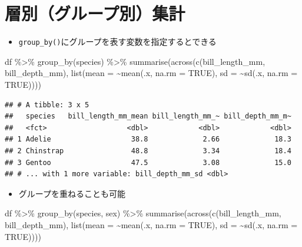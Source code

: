 \documentclass[
  xelatex,ja=standard, b5paper]{bxjsbook}
\newenvironment{Shaded}{\begin{snugshade}}{\end{snugshade}}
\newcommand{\AttributeTok}[1]{\textcolor[rgb]{0.77,0.63,0.00}{#1}}
\newcommand{\ConstantTok}[1]{\textcolor[rgb]{0.00,0.00,0.00}{#1}}
\newcommand{\FunctionTok}[1]{\textcolor[rgb]{0.00,0.00,0.00}{#1}}
\newcommand{\NormalTok}[1]{#1}
\newcommand{\SpecialCharTok}[1]{\textcolor[rgb]{0.00,0.00,0.00}{#1}}
\providecommand{\tightlist}{%
  \setlength{\itemsep}{0pt}\setlength{\parskip}{0pt}}
\begin{document}
\hypertarget{su-group}{%
\section{層別（グループ別）集計}\label{su-group}}

\begin{itemize}
\tightlist
\item
  \texttt{group\_by()}にグループを表す変数を指定するとできる
\end{itemize}

\begin{Shaded}
\begin{Highlighting}[]
\NormalTok{df }\SpecialCharTok{\%\textgreater{}\%} 
  \FunctionTok{group\_by}\NormalTok{(species) }\SpecialCharTok{\%\textgreater{}\%} 
  \FunctionTok{summarise}\NormalTok{(}\FunctionTok{across}\NormalTok{(}\FunctionTok{c}\NormalTok{(bill\_length\_mm, bill\_depth\_mm),}
                   \FunctionTok{list}\NormalTok{(}\AttributeTok{mean =} \SpecialCharTok{\textasciitilde{}}\FunctionTok{mean}\NormalTok{(.x, }\AttributeTok{na.rm =} \ConstantTok{TRUE}\NormalTok{),}
                        \AttributeTok{sd =} \SpecialCharTok{\textasciitilde{}}\FunctionTok{sd}\NormalTok{(.x, }\AttributeTok{na.rm =} \ConstantTok{TRUE}\NormalTok{))))}
\end{Highlighting}
\end{Shaded}

\begin{verbatim}
## # A tibble: 3 x 5
##   species   bill_length_mm_mean bill_length_mm_~ bill_depth_mm_m~
##   <fct>                   <dbl>            <dbl>            <dbl>
## 1 Adelie                   38.8             2.66             18.3
## 2 Chinstrap                48.8             3.34             18.4
## 3 Gentoo                   47.5             3.08             15.0
## # ... with 1 more variable: bill_depth_mm_sd <dbl>
\end{verbatim}

\begin{itemize}
\tightlist
\item
  グループを重ねることも可能
\end{itemize}

\begin{Shaded}
\begin{Highlighting}[]
\NormalTok{df }\SpecialCharTok{\%\textgreater{}\%} 
  \FunctionTok{group\_by}\NormalTok{(species, sex) }\SpecialCharTok{\%\textgreater{}\%} 
  \FunctionTok{summarise}\NormalTok{(}\FunctionTok{across}\NormalTok{(}\FunctionTok{c}\NormalTok{(bill\_length\_mm, bill\_depth\_mm),}
                   \FunctionTok{list}\NormalTok{(}\AttributeTok{mean =} \SpecialCharTok{\textasciitilde{}}\FunctionTok{mean}\NormalTok{(.x, }\AttributeTok{na.rm =} \ConstantTok{TRUE}\NormalTok{),}
                        \AttributeTok{sd =} \SpecialCharTok{\textasciitilde{}}\FunctionTok{sd}\NormalTok{(.x, }\AttributeTok{na.rm =} \ConstantTok{TRUE}\NormalTok{))))}
\end{Highlighting}
\end{Shaded}
\end{document}
